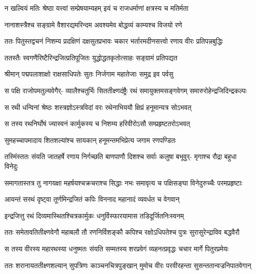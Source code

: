 \twolineshloka
{न खल्वियं मतिः श्रेष्ठा यत्त्वां सम्प्रेषयाम्यहम्}
{इयं च राजधर्माणां क्षत्रस्य च मतिर्मता} %

\twolineshloka
{नानाशस्त्रैश्च सङ्ग्रामे वैशारद्यमरिन्दम}
{अवश्यमेव बोद्धव्यं काम्यश्च विजयो रणे} %

\fourlineindentedshloka
{ततः पितुस्तद्वचनं निशम्य}
{प्रदक्षिणं दक्षसुतप्रभावः}
{चकार भर्तारमदीनसत्त्वो}
{रणाय वीरः प्रतिपन्नबुद्धिः} %

\twolineshloka
{ततस्तैः स्वगणैरिष्टैरिन्द्रजित्प्रतिपूजितः}
{युद्धोद्धतकृतोत्साहः सङ्ग्रामं प्रतिपद्यत} %

\twolineshloka
{श्रीमान् पद्मपलाशाक्षो राक्षसाधिपतेः सुतः}
{निर्जगाम महातेजाः समुद्र इव पर्वसु} %

\fourlineindentedshloka
{स पक्षि राजोपमतुल्यवेगैर्-}
{व्यालैश्चतुर्भिः सिततीक्ष्णदंष्ट्रैः}
{रथं समायुक्तमसङ्गवेगम्}
{समारुरोहेन्द्रजिदिन्द्रकल्पः} %

\twolineshloka
{स रथी धन्विनां श्रेष्ठः शस्त्रज्ञोऽस्त्रविदां वरः}
{रथेनाभिययौ क्षिप्रं हनूमान्यत्र सोऽभवत्} %

\twolineshloka
{स तस्य रथनिर्घोषं ज्यास्वनं कार्मुकस्य च}
{निशम्य हरिवीरोऽसौ सम्प्रहृष्टतरोऽभवत्} %

\twolineshloka
{सुमहच्चापमादाय शितशल्यांश्च सायकान्}
{हनूमन्तमभिप्रेत्य जगाम रणपण्डितः} %

\fourlineindentedshloka
{तस्मिंस्ततः संयति जातहर्षे}
{रणाय निर्गच्छति बाणपाणौ}
{दिशश्च सर्वाः कलुषा बभूवुर्-}
{मृगाश्च रौद्रा बहुधा विनेदुः} %

\fourlineindentedshloka
{समागतास्तत्र तु नागयक्षा}
{महर्षयश्चक्रचराश्च सिद्धाः}
{नभः समावृत्य च पक्षिसङ्घा}
{विनेदुरुच्चैः परमप्रहृष्टाः} %

\twolineshloka
{आयन्तं सरथं दृष्ट्वा तूर्णमिन्द्रजितं कपिः}
{विननाद महानादं व्यवर्धत च वेगवान्} %

\twolineshloka
{इन्द्रजित्तु रथं दिव्यमास्थितश्चित्रकार्मुकः}
{धनुर्विस्फारयामास तडिदूर्जितनिःस्वनम्} %

\fourlineindentedshloka
{ततः समेतावतितीक्ष्णवेगौ}
{महाबलौ तौ रणनिर्विशङ्कौ}
{कपिश्च रक्षोऽधिपतेश्च पुत्रः}
{सुरासुरेन्द्राविव बद्धवैरौ} %

\fourlineindentedshloka
{स तस्य वीरस्य महारथस्या}
{धनुष्मतः संयति सम्मतस्य}
{शरप्रवेगं व्यहनत्प्रवृद्धः}
{चचार मार्गे पितुरप्रमेयः} %

\fourlineindentedshloka
{ततः शरानायततीक्ष्णशल्यान्}
{सुपत्रिणः काञ्चनचित्रपुङ्खान्}
{मुमोच वीरः परवीरहन्ता}
{सुसन्ततान्वज्रनिपातवेगान्} %

